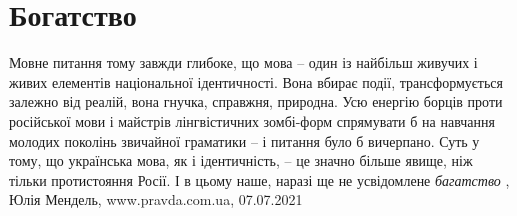  
 
 
 
 
\chapter{Богатство}
\label{sec:slova.bogatstvo}

Мовне питання тому завжди глибоке, що мова – один із найбільш живучих і живих
елементів національної ідентичності. Вона вбирає події, трансформується залежно
від реалій, вона гнучка, справжня, природна. 
Усю енергію борців проти російської мови і майстрів лінгвістичних зомбі-форм
спрямувати б на навчання молодих поколінь звичайної граматики – і питання було
б вичерпано. Суть у тому, що українська мова, як і ідентичність, – це значно
більше явище, ніж тільки протистояння Росії. І в цьому наше, наразі ще не
усвідомлене \emph{багатство}
, 
Юлія Мендель, www.pravda.com.ua, 07.07.2021
